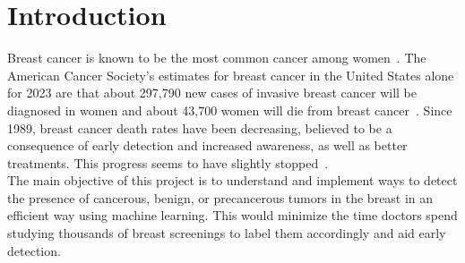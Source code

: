 \chapter{Introduction}

\label{intro}

\par Breast cancer is known to be the most common cancer among women~\cite{link1}. The American Cancer Society’s estimates for breast cancer in the United States alone for 2023 are that about 297,790 new cases of invasive breast cancer will be diagnosed in women and about 43,700 women will die from breast cancer~\cite{link2}. Since 1989, breast cancer death rates have been decreasing, believed to be a consequence of early detection and increased awareness, as well as better treatments. This progress seems to have slightly stopped~\cite{link2}.\\
The main objective of this project is to understand and implement ways to detect the presence of cancerous, benign, or precancerous tumors in the breast in an efficient way using machine learning. This would minimize the time doctors spend studying thousands of breast screenings to label them accordingly and aid early detection.